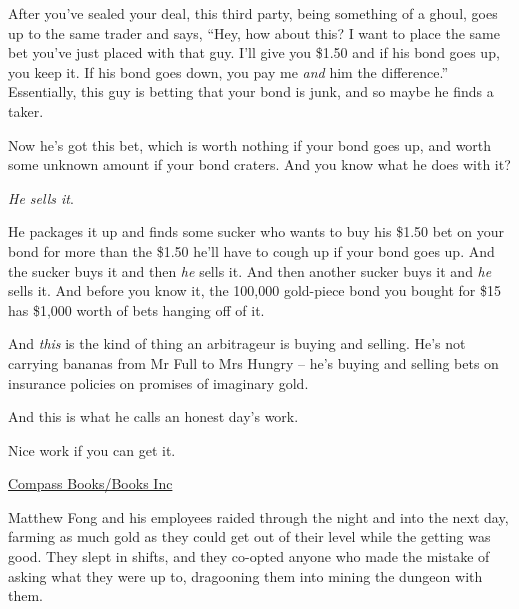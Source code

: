 After you've sealed your deal, this third party, being something of
a ghoul, goes up to the same trader and says, ``Hey, how about this?
I want to place the same bet you've just placed with that guy. I'll
give you \$1.50 and if his bond goes up, you keep it. If his bond
goes down, you pay me \emph{and} him the difference.'' Essentially,
this guy is betting that your bond is junk, and so maybe he finds a
taker.

Now he's got this bet, which is worth nothing if your bond goes up,
and worth some unknown amount if your bond craters. And you know
what he does with it?

\emph{He sells it}.

He packages it up and finds some sucker who wants to buy his \$1.50
bet on your bond for more than the \$1.50 he'll have to cough up if
your bond goes up. And the sucker buys it and then \emph{he} sells
it. And then another sucker buys it and \emph{he} sells it. And
before you know it, the 100,000 gold-piece bond you bought for \$15
has \$1,000 worth of bets hanging off of it.

And \emph{this} is the kind of thing an arbitrageur is buying and
selling. He's not carrying bananas from Mr Full to Mrs Hungry --
he's buying and selling bets on insurance policies on promises of
imaginary gold.

And this is what he calls an honest day's work.

Nice work if you can get it.

\tb

{\href{http://www.booksinc.net/NASApp/store/Product;jsessionid=abcF-ch09-pbU6m7ZRrLr?s=showproduct\&isbn=0765322166}{Compass Books/Books Inc}}

Matthew Fong and his employees raided through the night and into
the next day, farming as much gold as they could get out of their
level while the getting was good. They slept in shifts, and they
co-opted anyone who made the mistake of asking what they were up
to, dragooning them into mining the dungeon with them.

